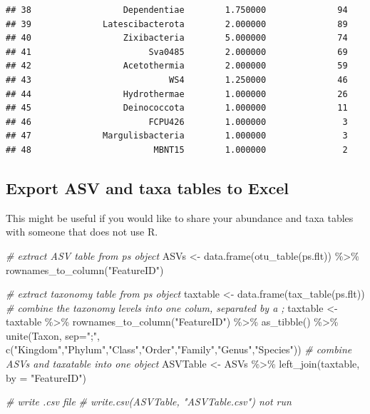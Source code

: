 \documentclass[
]{book}
\newenvironment{Shaded}{\begin{snugshade}}{\end{snugshade}}
\newcommand{\AttributeTok}[1]{\textcolor[rgb]{0.77,0.63,0.00}{#1}}
\newcommand{\CommentTok}[1]{\textcolor[rgb]{0.56,0.35,0.01}{\textit{#1}}}
\newcommand{\FunctionTok}[1]{\textcolor[rgb]{0.00,0.00,0.00}{#1}}
\newcommand{\NormalTok}[1]{#1}
\newcommand{\OtherTok}[1]{\textcolor[rgb]{0.56,0.35,0.01}{#1}}
\newcommand{\SpecialCharTok}[1]{\textcolor[rgb]{0.00,0.00,0.00}{#1}}
\newcommand{\StringTok}[1]{\textcolor[rgb]{0.31,0.60,0.02}{#1}}
\begin{document}
\begin{verbatim}
## 38                  Dependentiae        1.750000              94
## 39              Latescibacterota        2.000000              89
## 40                  Zixibacteria        5.000000              74
## 41                       Sva0485        2.000000              69
## 42                  Acetothermia        2.000000              59
## 43                           WS4        1.250000              46
## 44                  Hydrothermae        1.000000              26
## 45                  Deinococcota        1.000000              11
## 46                       FCPU426        1.000000               3
## 47              Margulisbacteria        1.000000               3
## 48                        MBNT15        1.000000               2
\end{verbatim}

\hypertarget{export-asv-and-taxa-tables-to-excel}{%
\subsection{Export ASV and taxa tables to Excel}\label{export-asv-and-taxa-tables-to-excel}}

This might be useful if you would like to share your abundance and taxa tables with someone that does not use R.

\begin{Shaded}
\begin{Highlighting}[]
\CommentTok{\# extract ASV table from ps object}
\NormalTok{ASVs }\OtherTok{\textless{}{-}} \FunctionTok{data.frame}\NormalTok{(}\FunctionTok{otu\_table}\NormalTok{(ps.flt)) }\SpecialCharTok{\%\textgreater{}\%} 
  \FunctionTok{rownames\_to\_column}\NormalTok{(}\StringTok{"FeatureID"}\NormalTok{)}

\CommentTok{\# extract taxonomy table from ps object}
\NormalTok{taxtable }\OtherTok{\textless{}{-}} \FunctionTok{data.frame}\NormalTok{(}\FunctionTok{tax\_table}\NormalTok{(ps.flt))}
\CommentTok{\# combine the taxonomy levels into one colum, separated by a ;}
\NormalTok{taxtable }\OtherTok{\textless{}{-}}\NormalTok{ taxtable }\SpecialCharTok{\%\textgreater{}\%}
  \FunctionTok{rownames\_to\_column}\NormalTok{(}\StringTok{"FeatureID"}\NormalTok{) }\SpecialCharTok{\%\textgreater{}\%} \FunctionTok{as\_tibble}\NormalTok{() }\SpecialCharTok{\%\textgreater{}\%}
  \FunctionTok{unite}\NormalTok{(Taxon, }\AttributeTok{sep=}\StringTok{";"}\NormalTok{, }\FunctionTok{c}\NormalTok{(}\StringTok{"Kingdom"}\NormalTok{,}\StringTok{"Phylum"}\NormalTok{,}\StringTok{"Class"}\NormalTok{,}\StringTok{"Order"}\NormalTok{,}\StringTok{"Family"}\NormalTok{,}\StringTok{"Genus"}\NormalTok{,}\StringTok{"Species"}\NormalTok{))}
\CommentTok{\# combine ASVs and taxatable into one object}
\NormalTok{ASVTable }\OtherTok{\textless{}{-}}\NormalTok{ ASVs }\SpecialCharTok{\%\textgreater{}\%} \FunctionTok{left\_join}\NormalTok{(taxtable, }\AttributeTok{by =} \StringTok{"FeatureID"}\NormalTok{)}

\CommentTok{\# write .csv file}
\CommentTok{\# write.csv(ASVTable, "ASVTable.csv") not run}
\end{Highlighting}
\end{Shaded}
\end{document}
